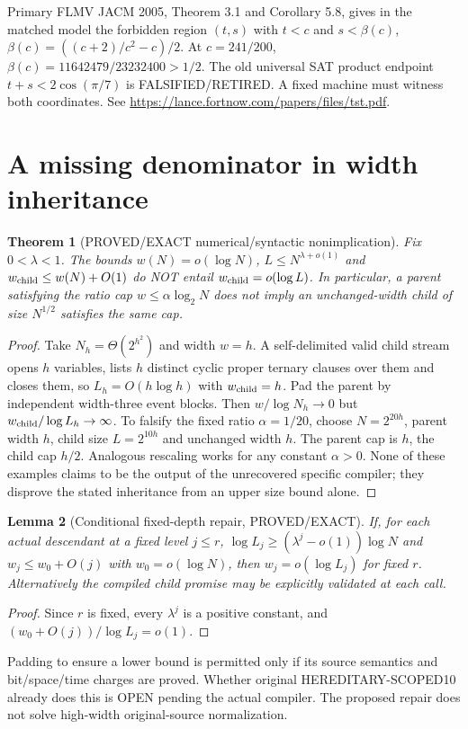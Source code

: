 \documentclass[11pt]{article}
\newtheorem{theorem}{Theorem}
\newtheorem{lemma}[theorem]{Lemma}
\begin{document}
\par\noindent Primary FLMV JACM 2005, Theorem 3.1 and Corollary 5.8, gives in the matched model the forbidden region $(t,s)$ with $t<c$ and $s<\beta(c)$, $\beta(c)=((c+2)/c^2-c)/2$. At $c=241/200$, $\beta(c)=11642479/23232400>1/2$. The old universal SAT product endpoint $t+s<2\cos(\pi/7)$ is FALSIFIED/RETIRED. A fixed machine must witness both coordinates. See \url{https://lance.fortnow.com/papers/files/tst.pdf}.
\section{A missing denominator in width inheritance}
\begin{theorem}[PROVED/EXACT numerical/syntactic nonimplication]
Fix $0<\lambda<1$. The bounds $w(N)=o(\log N)$, $L\le N^{\lambda+o(1)}$ and $w_{\rm child}\le w(N)+O(1)$ do NOT entail $w_{\rm child}=o(\log L)$. In particular, a parent satisfying the ratio cap $w\le\alpha\log_2N$ does not imply an unchanged-width child of size $N^{1/2}$ satisfies the same cap.
\end{theorem}
\begin{proof}
Take $N_h=\Theta(2^{h^2})$ and width $w=h$. A self-delimited valid child stream opens $h$ variables, lists $h$ distinct cyclic proper ternary clauses over them and closes them, so $L_h=O(h\log h)$ with $w_{\rm child}=h$. Pad the parent by independent width-three event blocks. Then $w/\log N_h\to0$ but $w_{\rm child}/\log L_h\to\infty$. To falsify the fixed ratio $\alpha=1/20$, choose $N=2^{20h}$, parent width $h$, child size $L=2^{10h}$ and unchanged width $h$. The parent cap is $h$, the child cap $h/2$. Analogous rescaling works for any constant $\alpha>0$. None of these examples claims to be the output of the unrecovered specific compiler; they disprove the stated inheritance from an upper size bound alone.
\end{proof}
\begin{lemma}[Conditional fixed-depth repair, PROVED/EXACT]
If, for each actual descendant at a fixed level $j\le r$, $\log L_j\ge(\lambda^j-o(1))\log N$ and $w_j\le w_0+O(j)$ with $w_0=o(\log N)$, then $w_j=o(\log L_j)$ for fixed $r$. Alternatively the compiled child promise may be explicitly validated at each call.
\end{lemma}
\begin{proof} Since $r$ is fixed, every $\lambda^j$ is a positive constant, and $(w_0+O(j))/\log L_j=o(1)$. \end{proof}
Padding to ensure a lower bound is permitted only if its source semantics and bit/space/time charges are proved. Whether original HEREDITARY-SCOPED10 already does this is OPEN pending the actual compiler. The proposed repair does not solve high-width original-source normalization.
\end{document}
